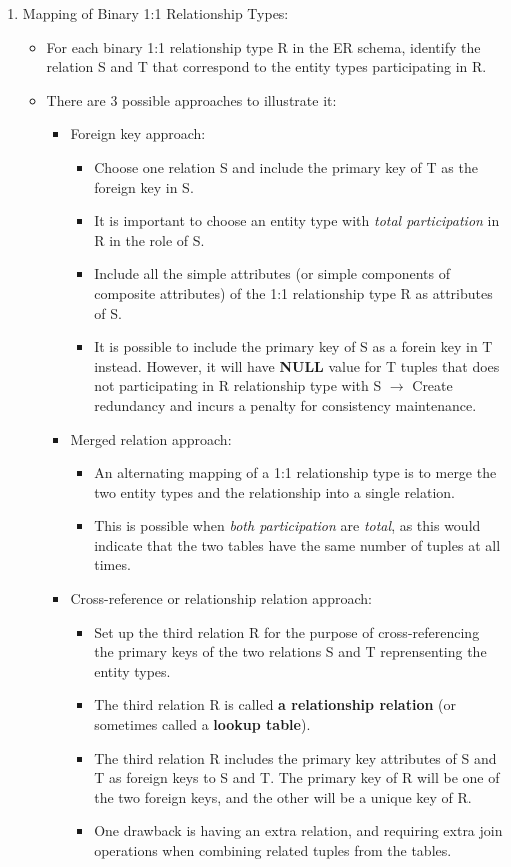 \documentclass[10pt]{article}
\begin{document}
\begin{enumerate}
	\item Mapping of Binary 1:1 Relationship Types:
	\begin{itemize}
		\item For each binary 1:1 relationship type R in the ER schema, identify the relation S and T that correspond to the entity types participating in R.
		\item There are 3 possible approaches to illustrate it: 
		\begin{itemize}
			\item Foreign key approach:
			\begin{itemize}
				\item Choose one relation S and include the primary key of T as the foreign key in S.
				\item It is important to choose an entity type with \textit{total participation} in R in the role of S.
				\item Include all the simple attributes (or simple components of composite attributes) of the 1:1 relationship type R as attributes of S.
				\item It is possible to include the primary key of S as a forein key in T instead. However, it will have \textbf{NULL} value for T tuples that does not participating in R relationship type with S $\rightarrow$ Create redundancy and incurs a penalty for consistency maintenance. 
			\end{itemize}

			\item Merged relation approach:
			\begin{itemize}
				\item An alternating mapping of a 1:1 relationship type is to merge the two entity types and the relationship into a single relation.
				\item This is possible when \textit{both participation} are \textit{total}, as this would indicate that the two tables have the same number of tuples at all times. 
			\end{itemize}

			\item Cross-reference or relationship relation approach:
			\begin{itemize}
				\item Set up the third relation R for the purpose of cross-referencing the primary keys of the two relations S and T reprensenting the entity types.
				\item The third relation R is called \textbf{a relationship relation} (or sometimes called a \textbf{lookup table}).
				\item The third relation R includes the primary key attributes of S and T as foreign keys to S and T. The primary key of R will be one of the two foreign keys, and the other will be a unique key of R.
				\item One drawback is having an extra relation, and requiring extra join operations when combining related tuples from the tables.
			\end{itemize}
		\end{itemize}
	\end{itemize}


\end{enumerate}
\end{document}

